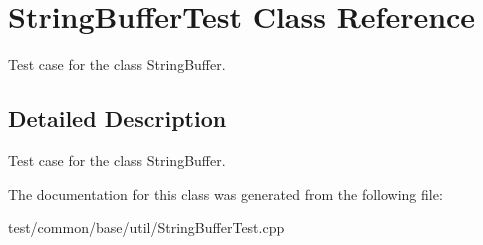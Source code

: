 \section{String\-Buffer\-Test Class Reference}
\label{classStringBufferTest}
Test case for the class String\-Buffer.  




\subsection{Detailed Description}
Test case for the class String\-Buffer. 



The documentation for this class was generated from the following file:\begin{CompactItemize}
\item 
test/common/base/util/String\-Buffer\-Test.cpp\end{CompactItemize}
